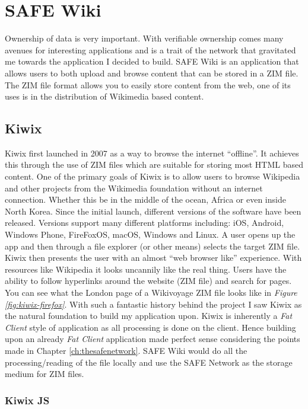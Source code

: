 \chapter{SAFE Wiki}

Ownership of data is very important. With verifiable ownership comes many avenues for interesting applications and is a trait of the network that gravitated me towards the application I decided to build. SAFE Wiki is an application that allows users to both upload and browse content that can be stored in a ZIM file. The ZIM file format allows you to easily store content from the web, one of its uses is in the distribution of Wikimedia based content.

\section{Kiwix}

Kiwix first launched in 2007 as a way to browse the internet ``offline''. It achieves this through the use of ZIM files which are suitable for storing most HTML based content. One of the primary goals of Kiwix is to allow users to browse Wikipedia and other projects from the Wikimedia foundation without an internet connection. Whether this be in the middle of the ocean, Africa or even inside North Korea. Since the initial launch, different versions of the software have been released. Versions support many different platforms including: iOS, Android, Windows Phone, FireFoxOS, macOS, Windows and Linux. A user opens up the app and then through a file explorer (or other means) selects the target ZIM file. Kiwix then presents the user with an almost ``web browser like'' experience. With resources like Wikipedia it looks uncannily like the real thing. Users have the ability to follow hyperlinks around the website (ZIM file) and search for pages. You can see what the London page of a Wikivoyage ZIM file looks like in \textit{Figure \ref{fig:kiwix-firefox}}. With such a fantastic history behind the project I saw Kiwix as the natural foundation to build my application upon. Kiwix is inherently a \textit{Fat Client} style of application as all processing is done on the client. Hence building upon an already \textit{Fat Client} application made perfect sense considering the points made in Chapter \ref{ch:thesafenetwork}. SAFE Wiki would do all the processing/reading of the file locally and use the SAFE Network as the storage medium for ZIM files.

\subsection{Kiwix JS}

